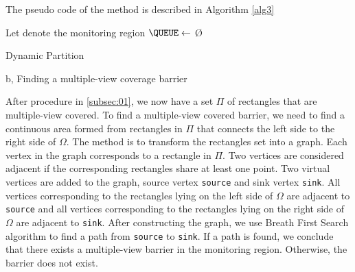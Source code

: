 The pseudo code of the method is described in Algorithm \ref{alg3}
%

%
\begin{center}
	\begin{minipage}{.7\linewidth}
		\begin{algorithm}[H]
			\DontPrintSemicolon
			\SetAlgoLined
			\newcommand{\forcondi}[2]{\ensuremath{#1 \in #2}}
			\BlankLine
			\BlankLine
			\BlankLine
			Let \root denote the monitoring region\;
			$\QUEUE\gets$ \O \;
			\enqueue{\root, \QUEUE} \;
			\caption{Dynamic Partition}
			\label{alg3}
		\end{algorithm}
	\end{minipage}
\end{center}

b, Finding a multiple-view coverage barrier

After procedure in \ref{subsec:01}, we now have a set $\Pi$ of rectangles that are multiple-view covered. To find a multiple-view covered barrier, we need to find a continuous area formed from rectangles in $\Pi$ that connects the left side to the right side of $\Omega$. The method is to transform the rectangles set into a graph. Each vertex in the graph corresponds to a rectangle in $\Pi$. Two vertices are considered adjacent if the corresponding rectangles share at least one point. Two virtual vertices are added to the graph, source vertex {\tt source} and sink vertex {\tt sink}. All vertices corresponding to the rectangles lying on the left side of $\Omega$ are adjacent to {\tt source} and all vertices corresponding to the rectangles lying on the right side of $\Omega$ are adjacent to {\tt sink}. After constructing the graph, we use Breath First Search algorithm to find a path from {\tt source} to {\tt sink}. If a path is found, we conclude that there exists a multiple-view barrier in the monitoring region. Otherwise, the barrier does not exist.